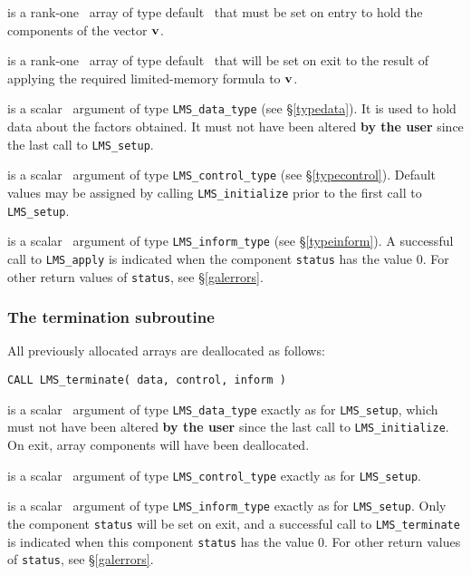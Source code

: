 \documentclass{galahad}
\newcommand{\packagename}{LMS}
\begin{document}
\vspace*{-3mm}
\begin{description}
 is a rank-one  \intentin\ array of type default \real\
that must be set on entry to hold the components of the vector ${\mathbf{v}}$.

 is a rank-one  \intentout\ array of type default \real\
that will be set on exit to the result of applying the required
 limited-memory formula to ${\mathbf{v}}$.

 is a scalar \intentinout\ argument of type
{\tt \packagename\_data\_type}
(see \S\ref{typedata}). It is used to hold data about the factors obtained.
It must not have been altered {\bf by the user} since the last call to
{\tt \packagename\_setup}.

 is a scalar \intentin\ argument of type
{\tt \packagename\_control\_type}
(see \S\ref{typecontrol}). Default values may be assigned by calling
{\tt \packagename\_initialize} prior to the first call to
{\tt \packagename\_setup}.

 is a scalar \intentout\ argument of type
{\tt \packagename\_inform\_type}
(see \S\ref{typeinform}). A successful call to {\tt \packagename\_apply}
is indicated when the  component {\tt status} has the value 0.
For other return values of {\tt status}, see \S\ref{galerrors}.

\end{description}


\subsubsection{The  termination subroutine}
All previously allocated arrays are deallocated as follows:
\vspace*{1mm}

\hspace{8mm}
{\tt CALL \packagename\_terminate( data, control, inform )}

\begin{description}

 is a scalar \intentinout\ argument of type
{\tt \packagename\_data\_type}
exactly as for
{\tt \packagename\_setup},
which must not have been altered {\bf by the user} since the last call to
{\tt \packagename\_initialize}.
On exit, array components will have been deallocated.

 is a scalar \intentin\ argument of type
{\tt \packagename\_control\_type}
exactly as for
{\tt \packagename\_setup}.

 is a scalar \intentout\ argument of type
{\tt \packagename\_inform\_type}
exactly as for
{\tt \packagename\_setup}.
Only the component {\tt status} will be set on exit, and a
successful call to
{\tt \packagename\_terminate}
is indicated when this  component {\tt status} has the value 0.
For other return values of {\tt status}, see \S\ref{galerrors}.

\end{description}
\end{document}
